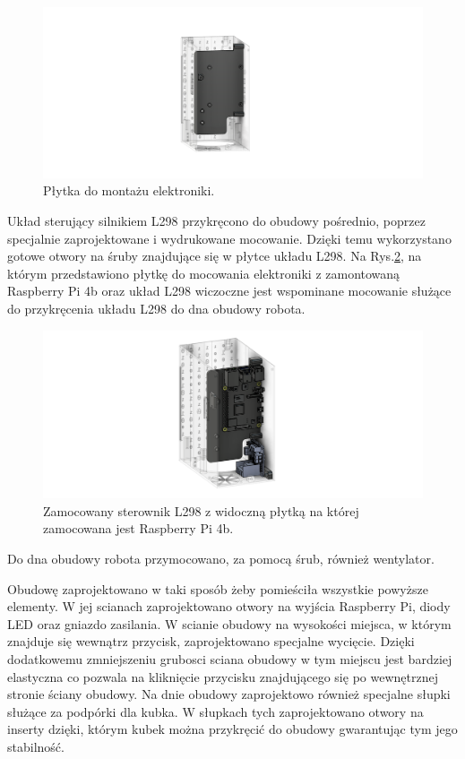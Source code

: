 \begin{figure}[H]
    \centering
    \includegraphics[width=0.95\linewidth]{chapters/03-praca-wlasna/figures/main_board.png}
    \caption{\label{fig:mainboard}Płytka do montażu elektroniki.}
\end{figure}

Układ sterujący silnikiem L298 przykręcono do obudowy pośrednio, poprzez specjalnie zaprojektowane i wydrukowane mocowanie. Dzięki temu wykorzystano
gotowe otwory na śruby znajdujące się w płytce układu L298. Na Rys.\ref{fig:steownik}, na którym przedstawiono płytkę do mocowania elektroniki
z zamontowaną Raspberry Pi 4b oraz układ L298 wiczoczne jest wspominane mocowanie służące do przykręcenia układu L298 do dna obudowy robota.

\begin{figure}[H]
    \centering
    \includegraphics[width=0.95\linewidth]{chapters/03-praca-wlasna/figures/l298n.png}
    \caption{\label{fig:steownik}Zamocowany sterownik L298 z widoczną płytką na której zamocowana jest Raspberry Pi 4b.}
\end{figure}

Do dna obudowy robota przymocowano, za pomocą śrub, również wentylator.

Obudowę zaprojektowano w taki sposób żeby pomieściła wszystkie powyższe elementy. W jej scianach zaprojektowano otwory na wyjścia Raspberry Pi, 
diody LED oraz gniazdo zasilania. W scianie obudowy na wysokości miejsca, w którym znajduje się wewnątrz przycisk, zaprojektowano specjalne wycięcie.
Dzięki dodatkowemu zmniejszeniu grubosci sciana obudowy w tym miejscu jest bardziej elastyczna co pozwala na kliknięcie przycisku znajdującego
się po wewnętrznej stronie ściany obudowy. Na dnie obudowy zaprojektowo również specjalne słupki służące za podpórki dla kubka. 
W słupkach tych zaprojektowano otwory na inserty dzięki, którym kubek można przykręcić do obudowy gwarantując tym jego stabilność.

